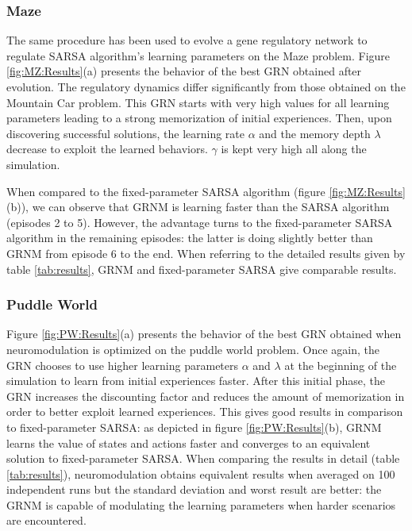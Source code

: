\subsubsection{Maze}
The same procedure has been used to evolve a gene regulatory network to regulate SARSA algorithm's learning parameters on the Maze problem. Figure \ref{fig:MZ:Results}(a) presents the behavior of the best GRN obtained after evolution. The regulatory dynamics differ significantly from those obtained on the Mountain Car problem. This GRN starts with very high values for all learning parameters leading to a strong memorization of initial experiences. Then, upon discovering successful solutions, the learning rate $\alpha$ and the memory depth $\lambda$ decrease to exploit the learned behaviors. $\gamma$ is kept very high all along the simulation.

When compared to the fixed-parameter SARSA algorithm (figure \ref{fig:MZ:Results}(b)), we can observe that GRNM is learning faster than the SARSA algorithm (episodes 2 to 5). However, the advantage turns to the fixed-parameter SARSA algorithm in the remaining episodes: the latter is doing slightly better than GRNM from episode 6 to the end. When referring to the detailed results given by table \ref{tab:results}, GRNM and fixed-parameter SARSA give comparable results. 

\subsubsection{Puddle World}
Figure \ref{fig:PW:Results}(a) presents the behavior of the best GRN obtained when neuromodulation is optimized on the puddle world problem. Once again, the GRN chooses to use higher learning parameters $\alpha$ and $\lambda$ at the beginning of the simulation to learn from initial experiences  faster. After this initial phase, the GRN increases the discounting factor and reduces the amount of memorization in order to better exploit learned experiences. This gives good results in comparison to fixed-parameter SARSA: as depicted in figure \ref{fig:PW:Results}(b), GRNM learns the value of states and actions faster and converges to an equivalent solution to fixed-parameter SARSA. When comparing the results in detail (table \ref{tab:results}), neuromodulation obtains equivalent results when averaged on 100 independent runs but the standard deviation and worst result are better: the GRNM is capable of modulating the learning parameters when harder scenarios are encountered. 

